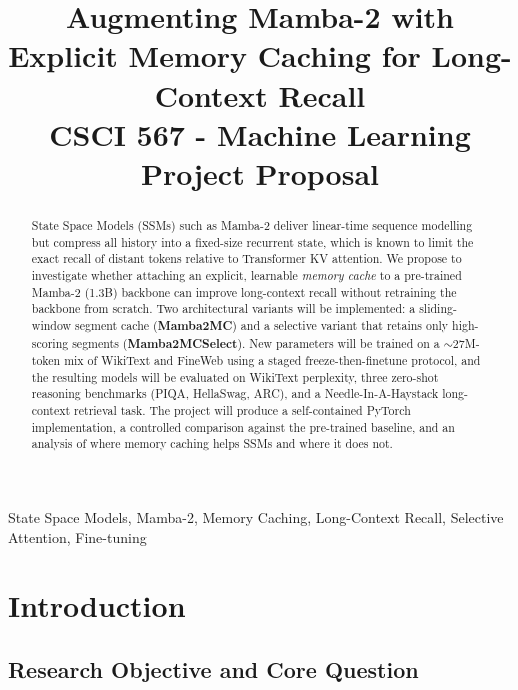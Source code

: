 \documentclass[conference]{IEEEtran}
\begin{document}
\title{Augmenting Mamba-2 with Explicit Memory Caching for Long-Context Recall\\
{\footnotesize CSCI 567 - Machine Learning Project Proposal}
}

\author{
}

\maketitle

\begin{abstract}
State Space Models (SSMs) such as Mamba-2 deliver linear-time sequence modelling but compress all history into a fixed-size recurrent state, which is known to limit the exact recall of distant tokens relative to Transformer KV attention. We propose to investigate whether attaching an explicit, learnable \emph{memory cache} to a pre-trained Mamba-2 (1.3B) backbone can improve long-context recall without retraining the backbone from scratch. Two architectural variants will be implemented: a sliding-window segment cache (\textbf{Mamba2MC}) and a selective variant that retains only high-scoring segments (\textbf{Mamba2MCSelect}). New parameters will be trained on a $\sim$27M-token mix of WikiText and FineWeb using a staged freeze-then-finetune protocol, and the resulting models will be evaluated on WikiText perplexity, three zero-shot reasoning benchmarks (PIQA, HellaSwag, ARC), and a Needle-In-A-Haystack long-context retrieval task. The project will produce a self-contained PyTorch implementation, a controlled comparison against the pre-trained baseline, and an analysis of where memory caching helps SSMs and where it does not.
\end{abstract}

\begin{IEEEkeywords}
State Space Models, Mamba-2, Memory Caching, Long-Context Recall, Selective Attention, Fine-tuning
\end{IEEEkeywords}

\section{Introduction}

\subsection{Research Objective and Core Question}
\end{document}
